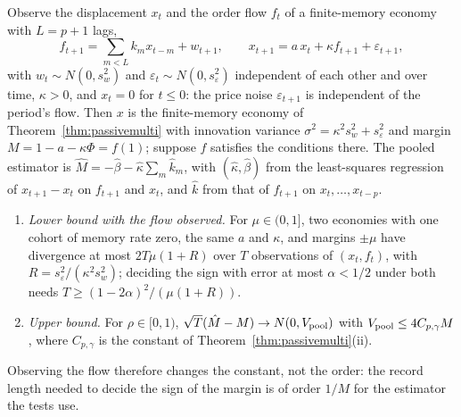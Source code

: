\begin{theorem}\label{thm:pooled}
Observe the displacement $x_t$ and the order flow $f_t$ of a finite-memory economy with $L=p+1$ lags,
\[
f_{t+1}=\sum_{m<L}k_mx_{t-m}+w_{t+1},\qquad x_{t+1}=a\,x_t+\kappa f_{t+1}+\varepsilon_{t+1},
\]
with $w_t\sim N(0,s_w^2)$ and $\varepsilon_t\sim N(0,s_\varepsilon^2)$ independent of each other and over time, $\kappa>0$, and $x_t=0$ for $t\le0$: the price noise $\varepsilon_{t+1}$ is independent of the period's flow. Then $x$ is the finite-memory economy of Theorem~\ref{thm:passivemulti} with innovation variance $\sigma^2=\kappa^2s_w^2+s_\varepsilon^2$ and margin $M=1-a-\kappa\Phi=f(1)$; suppose $f$ satisfies the conditions there. The pooled estimator is $\hat M=-\hat\beta-\hat\kappa\sum_m\hat k_m$, with $(\hat\kappa,\hat\beta)$ from the least-squares regression of $x_{t+1}-x_t$ on $f_{t+1}$ and $x_t$, and $\hat k$ from that of $f_{t+1}$ on $x_t,\dots,x_{t-p}$.
\begin{enumerate}[label=(\roman*)]
\item \emph{Lower bound with the flow observed.} For $\mu\in(0,1]$, two economies with one cohort of memory rate zero, the same $a$ and $\kappa$, and margins $\pm\mu$ have divergence at most $2T\mu(1+R)$ over $T$ observations of $(x_t,f_t)$, with $R=s_\varepsilon^2/(\kappa^2s_w^2)$; deciding the sign with error at most $\alpha<1/2$ under both needs $T\ge(1-2\alpha)^2/(\mu(1+R))$.
\item \emph{Upper bound.} For $\rho\in[0,1)$, $\sqrt T(\hat M-M)\to N(0,V_{\rm pool})$ with $V_{\rm pool}\le4C_{p,\gamma}M$, where $C_{p,\gamma}$ is the constant of Theorem~\ref{thm:passivemulti}(ii).
\end{enumerate}
Observing the flow therefore changes the constant, not the order: the record length needed to decide the sign of the margin is of order $1/M$ for the estimator the tests use.
\hfill\Proved
\end{theorem}

